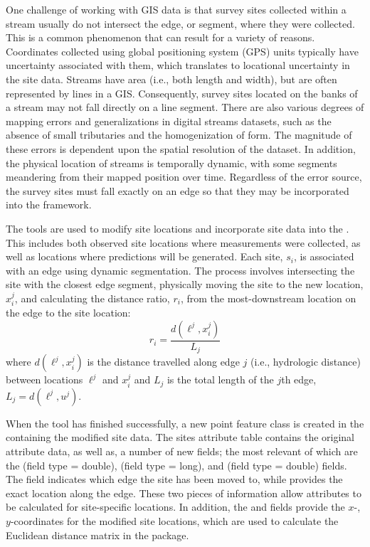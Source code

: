 \documentclass[article]{jss}
\begin{document}
One challenge of working with GIS data is that survey sites collected
within a stream usually do not intersect the edge, or segment, where they were collected. This is a common phenomenon that can result for a variety of reasons. Coordinates collected using global positioning system (GPS) units typically have uncertainty associated with them, which translates to locational uncertainty in the site data. Streams have area (i.e., both length and width), but are often represented by lines in a GIS. Consequently, survey sites located on the banks of a stream may not fall directly on a line segment. There are also various degrees of mapping errors and generalizations in digital streams datasets, such as the absence of small tributaries and the homogenization of form. The magnitude of these errors is dependent upon the spatial resolution of the dataset. In addition, the physical location of streams is temporally dynamic, with some segments meandering from their mapped position over time. Regardless of the error source, the survey sites must fall exactly on an edge so that they may be incorporated into the  framework.

The  tools are used to modify site locations and incorporate site data into the  \citep{Theo:Norm:Pete:Ferr:Wade:func:2006}. This includes both observed site locations where measurements were collected, as well as locations where predictions will be generated. Each site, $s_i$, is associated with an edge using dynamic segmentation. The process involves intersecting the site with the closest edge segment, physically moving the site to the new location, $x_i^j$, and calculating the distance ratio, $r_i$, from the most-downstream location on the edge to the site location:
\begin{equation} \label{eq:ri}
r_i = \frac{d(\ell^j,x_i^j)}{L_j}
\end{equation}
where $d(\ell^j,x_i^j)$ is the distance travelled along edge $j$ (i.e., hydrologic distance) between locations
$\ell^j$ and $x_i^j$ and $L_j$ is the total length of the $j$th edge, $L_j=d(\ell^j,u^j)$.

When the tool has finished successfully, a new point feature class is
created in the  containing the modified site data. The sites
attribute table contains the original attribute data, as well as, a
number of new fields; the most relevant of which are the 
(field type = double),  (field type = long), 
and  (field type = double) fields. The  field
indicates which edge the site has been moved to, while 
provides the exact location along the edge. These two pieces of
information allow attributes to be calculated for site-specific
locations. In addition, the  and  fields
provide the $x$-, $y$-coordinates for the modified site locations,
which are used to calculate the Euclidean distance matrix in the
 package.
\end{document}
